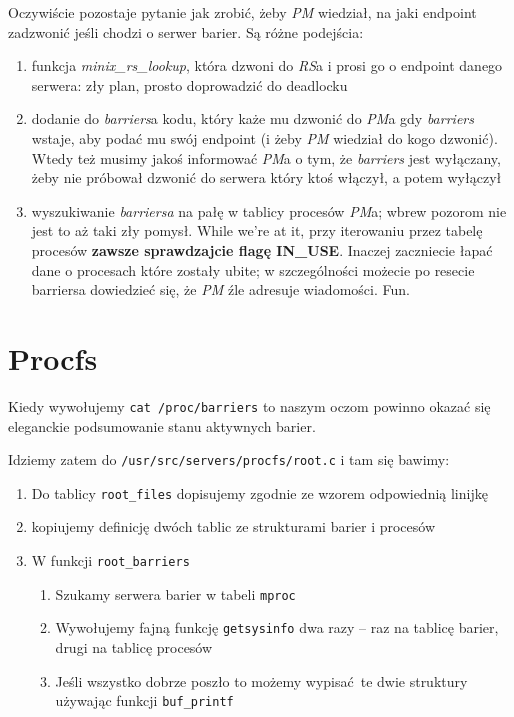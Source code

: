 Oczywiście pozostaje pytanie jak zrobić, żeby \textit{PM} wiedział, na jaki endpoint zadzwonić jeśli chodzi o serwer barier. Są różne podejścia:

\begin{enumerate}
    \item funkcja \textit{minix\_rs\_lookup}, która dzwoni do \textit{RS}a i prosi go o endpoint danego serwera: zły plan, prosto doprowadzić do deadlocku
    \item dodanie do \textit{barriers}a kodu, który każe mu dzwonić do \textit{PM}a gdy \textit{barriers} wstaje, aby podać mu swój endpoint (i żeby \textit{PM} wiedział do kogo dzwonić). Wtedy też musimy jakoś informować \textit{PM}a o tym, że \textit{barriers} jest wyłączany, żeby nie próbował dzwonić do serwera który ktoś włączył, a potem wyłączył
    \item wyszukiwanie \textit{barriersa} na pałę w tablicy procesów \textit{PM}a; wbrew pozorom nie jest to aż taki zły pomysł. While we're at it, przy iterowaniu przez tabelę procesów \textbf{zawsze sprawdzajcie flagę IN\_USE}. Inaczej zaczniecie łapać dane o procesach które zostały ubite; w szczególności możecie po resecie barriersa dowiedzieć się, że \textit{PM} źle adresuje wiadomości. Fun. 
\end{enumerate}

\section{Procfs}
Kiedy wywołujemy \texttt{cat /proc/barriers} to naszym oczom powinno okazać się eleganckie podsumowanie stanu aktywnych barier.

Idziemy zatem do \texttt{/usr/src/servers/procfs/root.c} i tam się bawimy:
\begin{enumerate}
    \item Do tablicy \texttt{root\_files} dopisujemy zgodnie ze wzorem odpowiednią linijkę
    \item kopiujemy definicję dwóch tablic ze strukturami barier i procesów\
    \item W funkcji \texttt{root\_barriers}
        \begin{enumerate}
            \item Szukamy serwera barier w tabeli \texttt{mproc}
            \item Wywołujemy fajną funkcję \texttt{getsysinfo} dwa razy -- raz na tablicę barier, drugi na tablicę procesów
            \item Jeśli wszystko dobrze poszło to możemy wypisać te dwie struktury używając funkcji \texttt{buf\_printf}
        \end{enumerate}
\end{enumerate}

